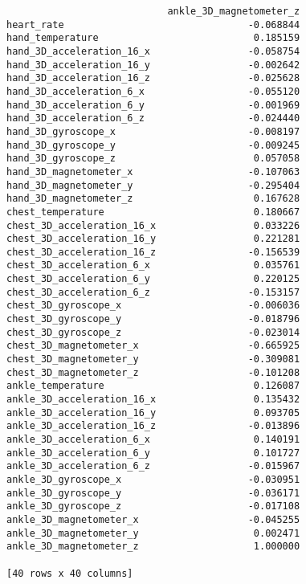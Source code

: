 \documentclass[11pt]{article}
\makeatletter
\newcommand{\boxspacing}{\kern\kvtcb@left@rule\kern\kvtcb@boxsep}
\newcommand{\prompt}[4]{
        \ttfamily\llap{{\color{#2}[#3]:\hspace{3pt}#4}}\vspace{-\baselineskip}
    }
\makeatother
\begin{document}
\begin{verbatim}
                            ankle_3D_magnetometer_z  
heart_rate                                -0.068844  
hand_temperature                           0.185159  
hand_3D_acceleration_16_x                 -0.058754  
hand_3D_acceleration_16_y                 -0.002642  
hand_3D_acceleration_16_z                 -0.025628  
hand_3D_acceleration_6_x                  -0.055120  
hand_3D_acceleration_6_y                  -0.001969  
hand_3D_acceleration_6_z                  -0.024440  
hand_3D_gyroscope_x                       -0.008197  
hand_3D_gyroscope_y                       -0.009245  
hand_3D_gyroscope_z                        0.057058  
hand_3D_magnetometer_x                    -0.107063  
hand_3D_magnetometer_y                    -0.295404  
hand_3D_magnetometer_z                     0.167628  
chest_temperature                          0.180667  
chest_3D_acceleration_16_x                 0.033226  
chest_3D_acceleration_16_y                 0.221281  
chest_3D_acceleration_16_z                -0.156539  
chest_3D_acceleration_6_x                  0.035761  
chest_3D_acceleration_6_y                  0.220125  
chest_3D_acceleration_6_z                 -0.153157  
chest_3D_gyroscope_x                      -0.006036  
chest_3D_gyroscope_y                      -0.018796  
chest_3D_gyroscope_z                      -0.023014  
chest_3D_magnetometer_x                   -0.665925  
chest_3D_magnetometer_y                   -0.309081  
chest_3D_magnetometer_z                   -0.101208  
ankle_temperature                          0.126087  
ankle_3D_acceleration_16_x                 0.135432  
ankle_3D_acceleration_16_y                 0.093705  
ankle_3D_acceleration_16_z                -0.013896  
ankle_3D_acceleration_6_x                  0.140191  
ankle_3D_acceleration_6_y                  0.101727  
ankle_3D_acceleration_6_z                 -0.015967  
ankle_3D_gyroscope_x                      -0.030951  
ankle_3D_gyroscope_y                      -0.036171  
ankle_3D_gyroscope_z                      -0.017108  
ankle_3D_magnetometer_x                   -0.045255  
ankle_3D_magnetometer_y                    0.002471  
ankle_3D_magnetometer_z                    1.000000  

[40 rows x 40 columns]
    \end{verbatim}

    
    \begin{tcolorbox}[breakable, size=fbox, boxrule=1pt, pad at break*=1mm,colback=cellbackground, colframe=cellborder]
\prompt{In}{incolor}{ }{\boxspacing}
\begin{Verbatim}[commandchars=\\\{\}]

\end{Verbatim}
\end{tcolorbox}
\end{document}
